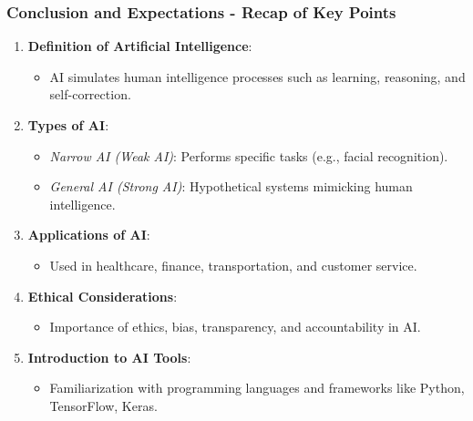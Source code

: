 \documentclass[aspectratio=169]{beamer}
\begin{document}
\begin{frame}[fragile]
    \frametitle{Conclusion and Expectations - Recap of Key Points}
    \begin{enumerate}
        \item \textbf{Definition of Artificial Intelligence}:
        \begin{itemize}
            \item AI simulates human intelligence processes such as learning, reasoning, and self-correction.
        \end{itemize}
        
        \item \textbf{Types of AI}:
        \begin{itemize}
            \item \textit{Narrow AI (Weak AI)}: Performs specific tasks (e.g., facial recognition).
            \item \textit{General AI (Strong AI)}: Hypothetical systems mimicking human intelligence.
        \end{itemize}
        
        \item \textbf{Applications of AI}:
        \begin{itemize}
            \item Used in healthcare, finance, transportation, and customer service.
        \end{itemize}
        
        \item \textbf{Ethical Considerations}:
        \begin{itemize}
            \item Importance of ethics, bias, transparency, and accountability in AI.
        \end{itemize}
        
        \item \textbf{Introduction to AI Tools}:
        \begin{itemize}
            \item Familiarization with programming languages and frameworks like Python, TensorFlow, Keras.
        \end{itemize}
    \end{enumerate}
\end{frame}
\end{document}
